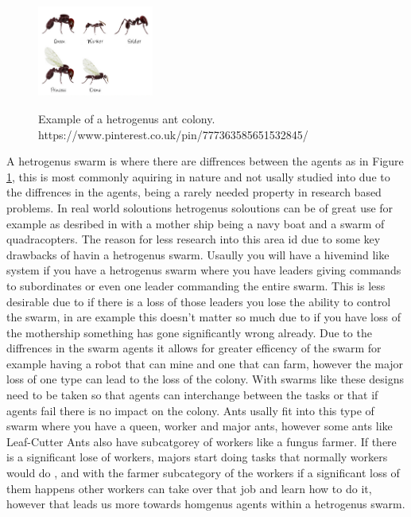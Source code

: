 \documentclass{UoYCSproject}
\begin{document}
\begin{figure}[htb]
\begin{center}
\label{fig:htb}
\includegraphics[height=3cm]{"./AntHetro.png"}
\end{center}
\caption{Example of a hetrogenus ant colony. https://www.pinterest.co.uk/pin/777363585651532845/}
\end{figure}

A hetrogenus swarm is where there are diffrences between the agents as in Figure \ref{fig:htb}, this is most commonly aquiring in nature and not usally studied into due to the diffrences in the agents, being a rarely needed property in research based problems.
In real world soloutions hetrogenus soloutions can be of great use for example as desribed in \cite{Swarm robotics reviewed} with a mother ship being a navy boat and a swarm of quadracopters.
The reason for less research into this area id due to some key drawbacks of havin a hetrogenus swarm.
Usaully you will have a hivemind like system if you have a hetrogenus swarm where you have leaders giving commands to subordinates or even one leader commanding the entire swarm.
This is less desirable due to if there is a loss of those leaders you lose the ability to control the swarm, in are example this doesn't matter so much due to if you have loss of the mothership something has gone significantly wrong already.
Due to the diffrences in the swarm agents it allows for greater efficency of the swarm for example having a robot that can mine and one that can farm, however the major loss of one type can lead to the loss of the colony.
With swarms like these designs need to be taken so that agents can interchange between the tasks or that if agents fail there is no impact on the colony.
Ants usally fit into this type of swarm where you have a queen, worker and major ants, however some ants like Leaf-Cutter Ants also have subcatgorey of workers like a fungus farmer.
If there is a significant lose of workers, majors start doing tasks that normally workers would do \cite{Swarm intellegiegence}, and with the farmer subcategory of the workers if a significant loss of them happens other workers can take over that job and learn how to do it, however that leads us more towards homgenus agents within a hetrogenus swarm.
\end{document}
